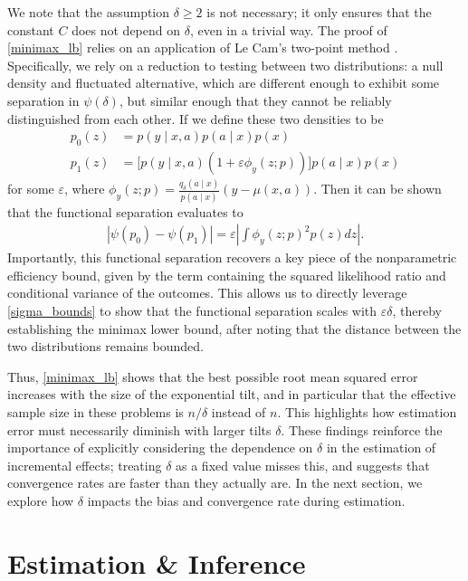 \documentclass[11pt,twoside]{article}
\theoremstyle{definition}
\theoremstyle{remark}
\begin{document}
We note that the assumption $\delta \geq 2$ is not necessary; it only ensures that the constant $C$ does not depend on $\delta$, even in a trivial way.  The proof of \cref{minimax_lb} relies on an application of Le Cam's two-point method \citep{tsbakov2009}. Specifically, we rely on a reduction to testing between two distributions: a null density and fluctuated alternative, which are different enough to exhibit some separation in $\psi(\delta)$, but similar enough that they cannot be reliably distinguished from each other. If we define these two densities to be
\begin{align*}
    p_0(z) &= p(y \mid x, a) p(a \mid x) p(x) \\
    p_1(z) &= \Big[p(y \mid x, a)(1 + \varepsilon \phi_y(z; p)) \Big]p(a \mid x) p(x)
\end{align*}
for some $\varepsilon$, where $ \phi_y(z; p) = \frac{q_\delta(a \mid x)}{p(a \mid x)}(y - \mu(x, a))$. Then it can be shown that the functional separation evaluates to
\begin{align*}
    |\psi(p_0) - \psi(p_1)|  = \varepsilon \left| \int  \phi_y(z; p)^2 p(z) dz \right|.
\end{align*}
Importantly, this functional separation recovers a key piece of the nonparametric efficiency bound, given by the term containing the squared likelihood ratio and conditional variance of the outcomes. This allows us to directly leverage \cref{sigma_bounds} to show that the functional separation scales with $\varepsilon \delta$, thereby establishing the minimax lower bound, after noting that the distance between the two distributions remains bounded.


Thus, \cref{minimax_lb} shows that the best possible root mean squared error increases with the size of the exponential tilt, and in particular that the effective sample size in these problems is $n/\delta$ instead of $n$. This highlights how estimation error must necessarily diminish with larger tilts $\delta$. These findings reinforce the importance of explicitly considering the dependence on $\delta$ in the estimation of incremental effects; treating $\delta$ as a fixed value misses this, and suggests that convergence rates are faster than they actually are. In the next section, we explore how $\delta$ impacts the bias and convergence rate during estimation. 

\section{Estimation \& Inference} \label{estimation_inference_section}
\end{document}
